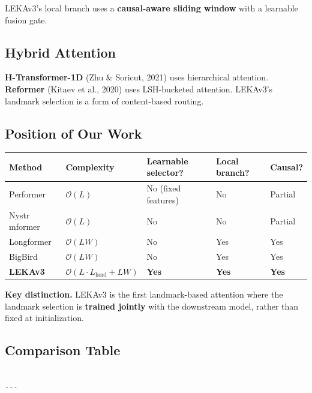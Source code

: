 LEKAv3's local branch uses a \textbf{causal-aware sliding window} with a learnable 
fusion gate.

\subsection{Hybrid Attention}

\textbf{H-Transformer-1D} (Zhu \& Soricut, 2021) uses hierarchical attention. 
\textbf{Reformer} (Kitaev et al., 2020) uses LSH-bucketed attention. LEKAv3's 
landmark selection is a form of content-based routing.

\subsection{Position of Our Work}

\begin{table}[H]
\centering
\small
\begin{tabular}{lllll}
\toprule
\textbf{Method} & \textbf{Complexity} & \textbf{Learnable selector?} & \textbf{Local branch?} & \textbf{Causal?} \\
\midrule
Performer & $\mathcal{O}(L)$ & No (fixed features) & No & Partial \\
Nystr mformer & $\mathcal{O}(L)$ & No & No & Partial \\
Longformer & $\mathcal{O}(L W)$ & No & Yes & Yes \\
BigBird & $\mathcal{O}(L W)$ & No & Yes & Yes \\
\textbf{LEKAv3} & $\mathcal{O}(L \cdot L_\text{land} + L W)$ & \textbf{Yes} & \textbf{Yes} & \textbf{Yes} \\
\bottomrule
\end{tabular}
\end{table}

\textbf{Key distinction.} LEKAv3 is the first landmark-based attention where the 
landmark selection is \textbf{trained jointly} with the downstream model, rather 
than fixed at initialization.



\subsection{Comparison Table}

\begin{lstlisting}

---
\end{lstlisting}

